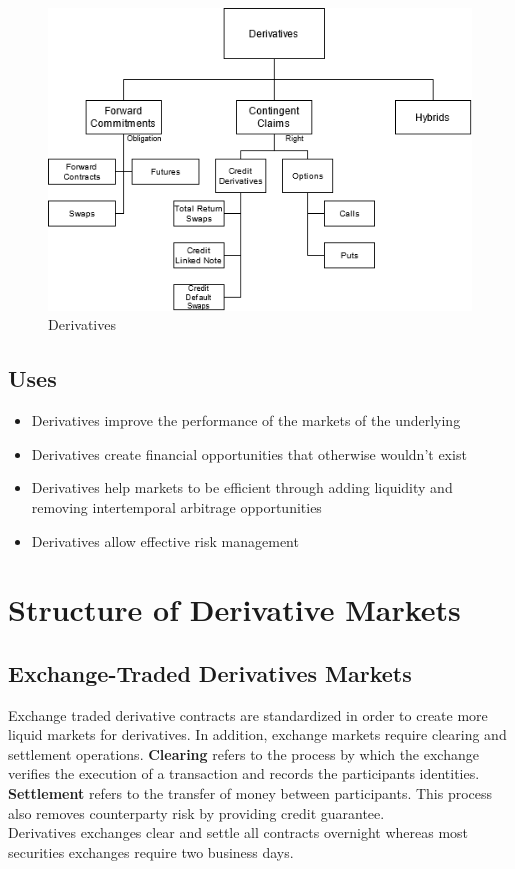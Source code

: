 \documentclass[fleqn,10pt]{SelfArx} %
\begin{document}
\begin{figure}[H]
	\centering
	\includegraphics[width=\linewidth]{1}
	\caption{Derivatives}
	\label{fig:results}
\end{figure}

\subsection{Uses}

\begin{itemize}
	\item Derivatives improve the performance of the markets of the underlying
	\item Derivatives create financial opportunities that otherwise wouldn't exist
	\item Derivatives help markets to be efficient through adding liquidity and removing intertemporal arbitrage opportunities
	\item Derivatives allow effective risk management
\end{itemize}

\newpage
\section{Structure of Derivative Markets}

\subsection{Exchange-Traded Derivatives Markets}

Exchange traded derivative contracts are standardized in order to create more liquid markets for derivatives. In addition, exchange markets require clearing and settlement operations. \textbf{Clearing} refers to the process by which the exchange verifies the execution of a transaction and records the participants identities. \textbf{Settlement} refers to the transfer of money between participants. This process also removes counterparty risk by providing credit guarantee.
\\
Derivatives exchanges clear and settle all contracts overnight whereas most securities exchanges require two business days.
\end{document}
